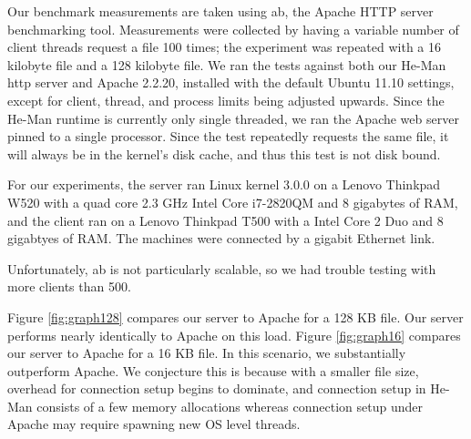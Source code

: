 \documentclass[preprint,11pt]{sigplanconf}
\begin{document}
Our benchmark measurements are taken using ab, the Apache HTTP server
benchmarking tool. \cite{ApacheAB} Measurements were collected by
having a variable number of client threads request a file 100 times;
the experiment was repeated with a 16 kilobyte file and a 128 kilobyte
file. We ran the tests against both our He-Man http server and Apache
2.2.20, installed with the default Ubuntu 11.10 settings, except for
client, thread, and process limits being adjusted upwards. Since the
He-Man runtime is currently only single threaded, we ran the Apache
web server pinned to a single processor. Since the test repeatedly
requests the same file, it will always be in the kernel's disk cache,
and thus this test is not disk bound.

For our experiments, the server ran Linux kernel 3.0.0 on a Lenovo
Thinkpad W520 with a quad core 2.3 GHz Intel Core i7-2820QM and 8
gigabytes of RAM, and the client ran on a Lenovo Thinkpad T500 with a
Intel Core 2 Duo and 8 gigabtyes of RAM.  %
The machines were connected by a gigabit Ethernet link.

Unfortunately, ab is not particularly scalable, so we had trouble
testing with more clients than 500.

Figure \ref{fig:graph128} compares our server to Apache for a 128 KB
file. Our server performs nearly identically to Apache on this load.
Figure \ref{fig:graph16} compares our server to Apache for a 16 KB
file. In this scenario, we substantially outperform Apache. We
conjecture this is because with a smaller file size, overhead for
connection setup begins to dominate, and connection setup in He-Man
consists of a few memory allocations whereas connection setup under
Apache may require spawning new OS level threads.
\end{document}
